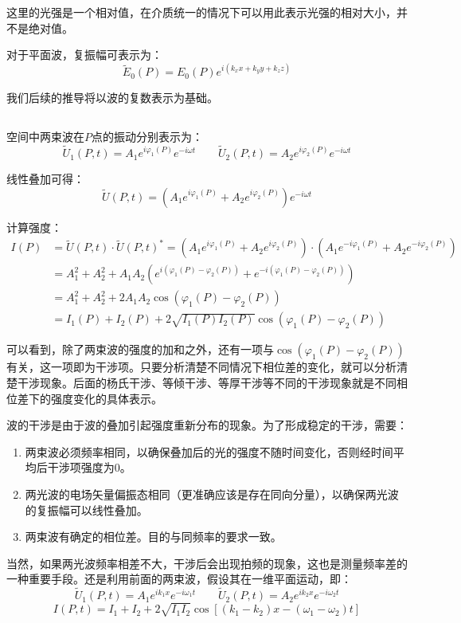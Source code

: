 这里的光强是一个相对值，在介质统一的情况下可以用此表示光强的相对大小，并不是绝对值。

对于平面波，复振幅可表示为：
\[\tilde{E}_0(P) = E_0(P) e^{i(k_x x + k_y y + k_z z)}\]

我们后续的推导将以波的复数表示为基础。
\subsection[干涉条件]{}
空间中两束波在$P$点的振动分别表示为：
\[\tilde{U}_1(P,t) = A_1 e^{i\varphi_1(P)} e^{-i\omega t}\qquad \tilde{U}_2(P,t) = A_2 e^{i\varphi_2(P)} e^{-i\omega t}\]

线性叠加可得：
\[\tilde{U}(P,t) = (A_1 e^{i\varphi_1(P)} + A_2 e^{i\varphi_2(P)}) e^{-i\omega t}\]

计算强度：
\begin{align*}
    I(P) &= \tilde{U}(P,t)\cdot \tilde{U}(P,t)^* = (A_1 e^{i\varphi_1(P)} + A_2 e^{i\varphi_2(P)})\cdot (A_1 e^{-i\varphi_1(P)} + A_2 e^{-i\varphi_2(P)})\\
    &= A_1^2 + A_2^2 + A_1A_2 (e^{i(\varphi_1(P) - \varphi_2(P))} + e^{-i(\varphi_1(P) - \varphi_2(P))})\\
    &= A_1^2 + A_2^2 + 2A_1A_2 \cos(\varphi_1(P) - \varphi_2(P))\\
    &= I_1(P) + I_2(P) + 2\sqrt{I_1(P)I_2(P)} \cos(\varphi_1(P) - \varphi_2(P))
\end{align*}

可以看到，除了两束波的强度的加和之外，还有一项与$\cos(\varphi_1(P) - \varphi_2(P))$有关，这一项即为干涉项。只要分析清楚不同情况下相位差的变化，就可以分析清楚干涉现象。后面的杨氏干涉、等倾干涉、等厚干涉等不同的干涉现象就是不同相位差下的强度变化的具体表示。
\begin{law}
    波的干涉是由于波的叠加引起强度重新分布的现象。为了形成稳定的干涉，需要：
    \begin{enumerate}
        \item 两束波必须频率相同，以确保叠加后的光的强度不随时间变化，否则经时间平均后干涉项强度为0。
        \item 两光波的电场矢量偏振态相同（更准确应该是存在同向分量），以确保两光波的复振幅可以线性叠加。
        \item 两束波有确定的相位差。目的与同频率的要求一致。
    \end{enumerate}
\end{law}

当然，如果两光波频率相差不大，干涉后会出现拍频的现象，这也是测量频率差的一种重要手段。还是利用前面的两束波，假设其在一维平面运动，即：
\[\tilde{U}_1(P,t) = A_1 e^{ik_1 x} e^{-i\omega_1 t}\qquad \tilde{U}_2(P,t) = A_2 e^{ik_2 x} e^{-i\omega_2 t}\]
\[I(P,t) = I_1 + I_2 + 2\sqrt{I_1I_2}\cos[(k_1 - k_2)x - (\omega_1 - \omega_2)t]\]

